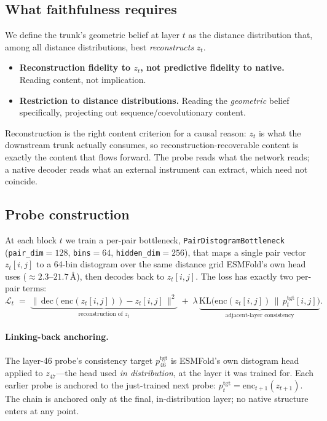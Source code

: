 \documentclass[11pt]{article}
\begin{document}
\subsection{What faithfulness requires}
\label{sec:faithful}

We define the trunk's geometric belief at layer $t$ as the distance distribution
that, among all distance distributions, best \emph{reconstructs} $z_t$.
\begin{itemize}[leftmargin=1.3em,itemsep=1pt]
\item \textbf{Reconstruction fidelity to $z_t$, not predictive fidelity to
  native.} Reading content, not implication.
\item \textbf{Restriction to distance distributions.} Reading the \emph{geometric}
  belief specifically, projecting out sequence/coevolutionary content.
\end{itemize}
Reconstruction is the right content criterion for a causal reason: $z_t$ is what
the downstream trunk actually consumes, so reconstruction-recoverable content is
exactly the content that flows forward. The probe reads what the network reads; a
native decoder reads what an external instrument can extract, which need not
coincide.

\subsection{Probe construction}
\label{sec:probe-construction}

At each block $t$ we train a per-pair bottleneck,
\texttt{PairDistogramBottleneck} (\texttt{pair\_dim}$=128$, \texttt{bins}$=64$,
\texttt{hidden\_dim}$=256$), that maps a single pair vector $z_t[i,j]$ to a
64-bin distogram over the same distance grid ESMFold's own head uses
($\approx 2.3$--$21.7$\,\AA), then decodes back to $z_t[i,j]$. The loss has
exactly two per-pair terms:
\begin{equation}
\mathcal{L}_t \;=\;
\underbrace{\big\| \,\mathrm{dec}(\mathrm{enc}(z_t[i,j])) - z_t[i,j]\,\big\|^2}_{\text{reconstruction of } z_t}
\;+\;
\lambda\,\underbrace{\mathrm{KL}\!\big(\mathrm{enc}(z_t[i,j]) \,\big\|\, p^{\text{tgt}}_t[i,j]\big)}_{\text{adjacent-layer consistency}} .
\end{equation}

\paragraph{Linking-back anchoring.}
The layer-46 probe's consistency target $p^{\text{tgt}}_{46}$ is ESMFold's own
distogram head applied to $z_{47}$---the head used \emph{in distribution}, at the
layer it was trained for. Each earlier probe is anchored to the just-trained next
probe: $p^{\text{tgt}}_t = \mathrm{enc}_{t+1}(z_{t+1})$. The chain is anchored
only at the final, in-distribution layer; no native structure enters at any
point.
\end{document}

